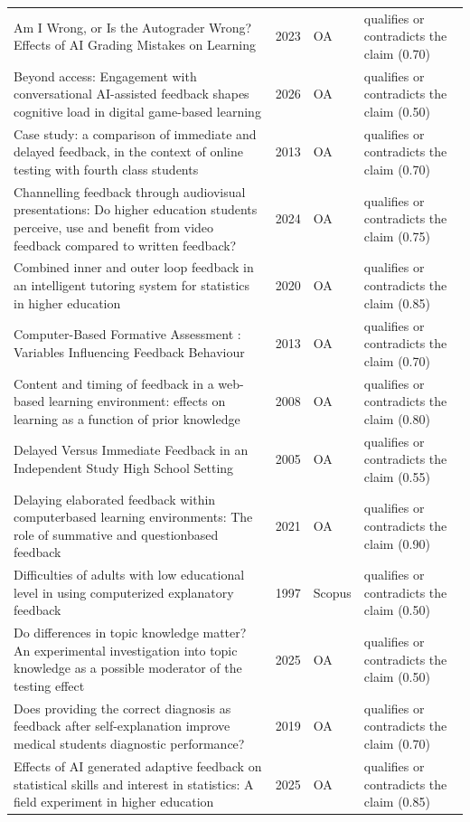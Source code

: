 \begin{longtable}{@{}%
  >{\raggedright\arraybackslash}p{}c%
  >{\raggedright\arraybackslash}p{}%
  >{\raggedright\arraybackslash}p{}@{}}
Am I Wrong, or Is the Autograder Wrong? Effects of AI Grading Mistakes on Learning & 2023 & OA & qualifies or contradicts the claim (0.70) \\
Beyond access: Engagement with conversational AI-assisted feedback shapes cognitive load in digital game-based learning & 2026 & OA & qualifies or contradicts the claim (0.50) \\
Case study: a comparison of immediate and delayed feedback, in the context of online testing with fourth class students & 2013 & OA & qualifies or contradicts the claim (0.70) \\
Channelling feedback through audiovisual presentations: Do higher education students perceive, use and benefit from video feedback compared to written feedback? & 2024 & OA & qualifies or contradicts the claim (0.75) \\
Combined inner and outer loop feedback in an intelligent tutoring system for statistics in higher education & 2020 & OA & qualifies or contradicts the claim (0.85) \\
Computer-Based Formative Assessment : Variables Influencing Feedback Behaviour & 2013 & OA & qualifies or contradicts the claim (0.70) \\
Content and timing of feedback in a web-based learning environment: effects on learning as a function of prior knowledge & 2008 & OA & qualifies or contradicts the claim (0.80) \\
Delayed Versus Immediate Feedback in an Independent Study High School Setting & 2005 & OA & qualifies or contradicts the claim (0.55) \\
Delaying elaborated feedback within computerbased learning environments: The role of summative and questionbased feedback & 2021 & OA & qualifies or contradicts the claim (0.90) \\
Difficulties of adults with low educational level in using computerized explanatory feedback & 1997 & Scopus & qualifies or contradicts the claim (0.50) \\
Do differences in topic knowledge matter? An experimental investigation into topic knowledge as a possible moderator of the testing effect & 2025 & OA & qualifies or contradicts the claim (0.50) \\
Does providing the correct diagnosis as feedback after self-explanation improve medical students diagnostic performance? & 2019 & OA & qualifies or contradicts the claim (0.70) \\
Effects of AI generated adaptive feedback on statistical skills and interest in statistics: A field experiment in higher education & 2025 & OA & qualifies or contradicts the claim (0.85) \\

\end{longtable}
